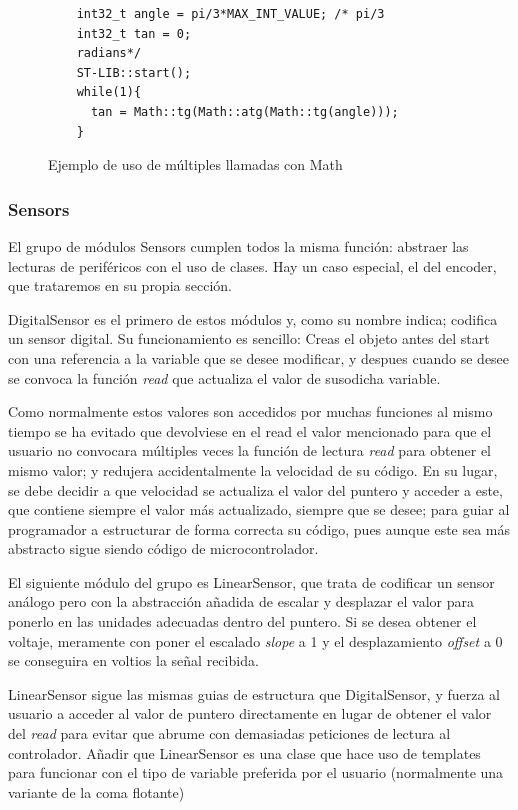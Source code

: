 \documentclass{report}
\begin{document}
\begin{figure}[H]
  \begin{lstlisting}
    int32_t angle = pi/3*MAX_INT_VALUE; /* pi/3 
    int32_t tan = 0;
    radians*/
    ST-LIB::start();
    while(1){
      tan = Math::tg(Math::atg(Math::tg(angle)));
    }
  \end{lstlisting}
  \caption{Ejemplo de uso de múltiples llamadas con Math}
  \label{MathNestedCode}
\end{figure}

\subsubsection{Sensors}
El grupo de módulos Sensors cumplen todos la misma función: abstraer las lecturas de periféricos con el uso de clases. Hay un caso especial, el del encoder, que trataremos en su propia sección. 
\par \vspace{0.3cm}
DigitalSensor es el primero de estos módulos y, como su nombre indica; codifica un sensor digital. Su funcionamiento es sencillo: Creas el objeto antes del start con una referencia a la variable que se desee modificar, y despues cuando se desee se convoca la función \textit{read} que actualiza el valor de susodicha variable. \par
Como normalmente estos valores son accedidos por muchas funciones al mismo tiempo se ha evitado que devolviese en el read el valor mencionado para que el usuario no convocara múltiples veces la función de lectura \textit{read} para obtener el mismo valor; y redujera accidentalmente la velocidad de su código. En su lugar, se debe decidir a que velocidad se actualiza el valor del puntero y acceder a este, que contiene siempre el valor más actualizado, siempre que se desee; para guiar al programador a estructurar de forma correcta su código, pues aunque este sea más abstracto sigue siendo código de microcontrolador. 
\par \vspace{0.3cm}
El siguiente módulo del grupo es LinearSensor, que trata de codificar un sensor análogo pero con la abstracción añadida de escalar y desplazar el valor para ponerlo en las unidades adecuadas dentro del puntero. Si se desea obtener el voltaje, meramente con poner el escalado \textit{slope} a 1 y el desplazamiento \textit{offset} a 0 se conseguira en voltios la señal recibida. \par
LinearSensor sigue las mismas guias de estructura que DigitalSensor, y fuerza al usuario a acceder al valor de puntero directamente en lugar de obtener el valor del \textit{read} para evitar que abrume con demasiadas peticiones de lectura al controlador. Añadir que LinearSensor es una clase que hace uso de templates para funcionar con el tipo de variable preferida por el usuario (normalmente una variante de la coma flotante)
\end{document}
